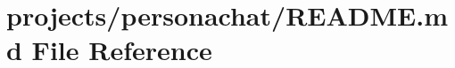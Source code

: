 \hypertarget{projects_2personachat_2README_8md}{}\section{projects/personachat/\+R\+E\+A\+D\+ME.md File Reference}
\label{projects_2personachat_2README_8md}
